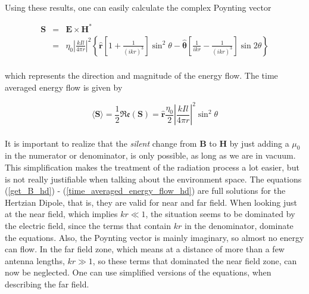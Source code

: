\documentclass[a4paper,10pt]{thesis}
\begin{document}
\paragraph*{}
Using these results, one can easily calculate the complex Poynting vector

\begin{eqnarray} \label{poynting_hd}
\mathbf{S}&=&\mathbf{E} \times \mathbf{H}^* \\
&=& \eta_0 \left| \frac{ k I l}{4 \pi r}\right|^2 \left\{ \mathbf{\hat{r} }\left[ 1 + \frac{1}{(ikr)^3}\right] \sin^2 \theta - \mathbf{\hat{\theta}} \left[ \frac{1}{ikr} - \frac{1}{(ikr)^3}\right] \sin 2\theta \right\} \nonumber
\end{eqnarray}

\paragraph*{}
which represents the direction and magnitude of the energy flow. The time averaged energy flow is given by

\begin{equation}\label{time_averaged_energy_flow_hd}
\langle \mathbf{S} \rangle = \frac{1}{2} \mathfrak{Re} (\mathbf{S}) =\mathbf{ \hat{r}} \frac{\eta_0}{2} \left| \frac{ k I l}{4 \pi r}\right|^2 \sin^2 \theta
\end{equation}

\paragraph*{}
It is important to realize that the \emph{silent} change from \textbf{B} to \textbf{H} by just adding a $\mu_0$ in the numerator or denominator, is only possible, as long as we are in vacuum. This simplification makes the treatment of the radiation process a lot easier, but is not really justifiable when talking about the environment space. The equations (\ref{get_B_hd}) - (\ref{time_averaged_energy_flow_hd}) are full solutions for the Hertzian Dipole, that is, they are valid for near and far field. When looking just at the near field, which implies $kr\ll 1$, the situation seems to be dominated by the electric field, since the terms that contain $kr$ in the denominator, dominate the equations. Also, the Poynting vector is mainly imaginary, so almost no energy can flow. In the far field zone, which means at a distance of more than a few antenna lengths, $kr \gg 1$, so these terms  that dominated the near field zone, can now be neglected. One can use simplified versions of the equations, when describing the far field.
\end{document}
